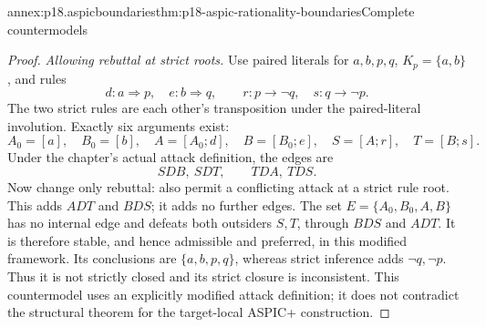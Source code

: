 \begin{annexitem}{annex:p18.aspicboundaries}{thm:p18-aspic-rationality-boundaries}{Complete countermodels}
\begin{proof}
\emph{Allowing rebuttal at strict roots.}
Use paired literals for \(a,b,p,q\), \(K_p=\{a,b\}\), and rules
\[
 d:a\Rightarrow p,\quad e:b\Rightarrow q,\qquad
 r:p\to\neg q,\quad s:q\to\neg p .
\]
The two strict rules are each other's transposition under the paired-literal
involution. Exactly six arguments exist:
\[
 A_0=[a],\quad B_0=[b],\quad
 A=[A_0;d],\quad B=[B_0;e],\quad
 S=[A;r],\quad T=[B;s].
\]
Under the chapter's actual attack definition, the edges are
\[
 S D B,\ S D T,\qquad T D A,\ T D S .
\]
Now change only rebuttal: also permit a conflicting attack at a strict
rule root. This adds \(A D T\) and \(B D S\); it adds no further edges.
The set \(E=\{A_0,B_0,A,B\}\) has no internal edge and defeats both
outsiders \(S,T\), through \(B D S\) and \(A D T\).
It is therefore stable, and hence admissible and preferred, in this
modified framework.
Its conclusions are \(\{a,b,p,q\}\), whereas strict inference adds
\(\neg q,\neg p\). Thus it is not strictly closed and its strict closure
is inconsistent. This countermodel uses an explicitly modified attack
definition; it does not contradict the structural theorem for the
target-local ASPIC+ construction.
\end{proof}
\end{annexitem}

